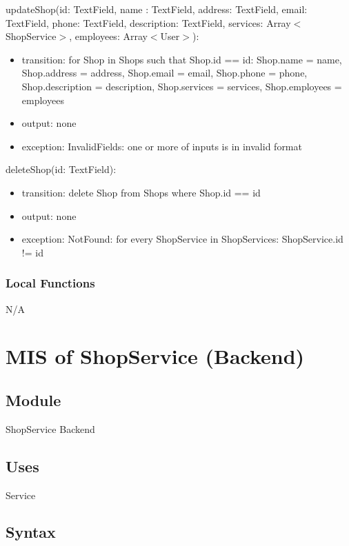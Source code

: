 \documentclass[12pt, titlepage]{article}
\begin{document}
\noindent updateShop(id: TextField, name : TextField, address: TextField, email: TextField, phone: TextField, description: TextField, services: Array$<$ShopService$>$, employees: Array$<$User$>$):
\begin{itemize}
    \item transition: for Shop in Shops such that Shop.id == id: Shop.name = name, Shop.address = address, Shop.email = email, Shop.phone = phone, Shop.description = description, Shop.services = services, Shop.employees = employees
    \item output: none
    \item exception: InvalidFields: one or more of inputs is in invalid format
\end{itemize}

\noindent deleteShop(id: TextField):
\begin{itemize}
    \item transition: delete Shop from Shops where Shop.id == id
    \item output: none
    \item exception: NotFound: for every ShopService in ShopServices: ShopService.id != id
\end{itemize}

\subsubsection{Local Functions}

N/A

\newpage

\section{MIS of ShopService (Backend)} \label{Module}

\subsection{Module}

ShopService Backend

\subsection{Uses}
Service

\subsection{Syntax}
\end{document}
